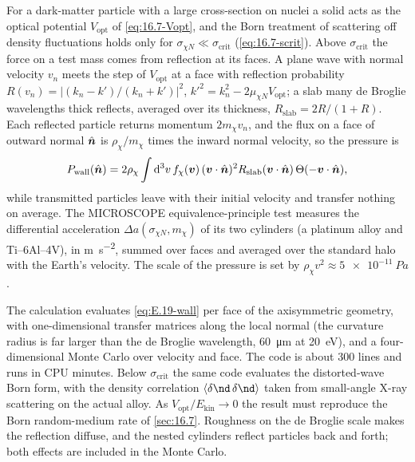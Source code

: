 For a dark-matter particle with a large cross-section on nuclei a solid acts as the optical potential $V_{\mathrm{opt}}$ of \cref{eq:16.7-Vopt}, and the Born treatment of scattering off density fluctuations holds only for $\sigma_{\chi N} \ll \sigma_{\mathrm{crit}}$ (\cref{eq:16.7-scrit}). Above $\sigma_{\mathrm{crit}}$ the force on a test mass comes from reflection at its faces. A plane wave with normal velocity $v_n$ meets the step of $V_{\mathrm{opt}}$ at a face with reflection probability $R(v_n) = |(k_n - k')/(k_n + k')|^2$, $k'^2 = k_n^2 - 2\mu_{\chi N}V_{\mathrm{opt}}$; a slab many de Broglie wavelengths thick reflects, averaged over its thickness, $R_{\mathrm{slab}} = 2R/(1 + R)$. Each reflected particle returns momentum $2m_\chi v_n$, and the flux on a face of outward normal $\hat{\bm{n}}$ is $\rho_\chi/m_\chi$ times the inward normal velocity, so the pressure is
\begin{equation}
  P_{\mathrm{wall}}(\hat{\bm{n}}) = 2\rho_\chi\int\mathrm{d}^3v\,f_\chi(\bm{v})\,(\bm{v}\cdot\hat{\bm{n}})^2R_{\mathrm{slab}}(\bm{v}\cdot\hat{\bm{n}})\,\Theta(-\bm{v}\cdot\hat{\bm{n}}) ,
  \label{eq:E.19-wall}
\end{equation}
while transmitted particles leave with their initial velocity and transfer nothing on average. The MICROSCOPE equivalence-principle test measures the differential acceleration $\Delta a(\sigma_{\chi N},m_\chi)$ of its two cylinders (a platinum alloy and Ti--6Al--4V), in \si{m.s^{-2}}, summed over faces and averaged over the standard halo with the Earth's velocity. The scale of the pressure is set by $\rho_\chi v^2 \approx \SI{5e-11}{Pa}$.

The calculation evaluates \cref{eq:E.19-wall} per face of the axisymmetric geometry, with one-dimensional transfer matrices along the local normal (the curvature radius is far larger than the de Broglie wavelength, \SI{60}{\micro m} at \SI{20}{eV}), and a four-dimensional Monte Carlo over velocity and face. The code is about 300 lines and runs in CPU minutes. Below $\sigma_{\mathrm{crit}}$ the same code evaluates the distorted-wave Born form, with the density correlation $\langle\delta\nd\,\delta\nd\rangle$ taken from small-angle X-ray scattering on the actual alloy. As $V_{\mathrm{opt}}/E_{\mathrm{kin}} \to 0$ the result must reproduce the Born random-medium rate of \cref{sec:16.7}. Roughness on the de Broglie scale makes the reflection diffuse, and the nested cylinders reflect particles back and forth; both effects are included in the Monte Carlo.

